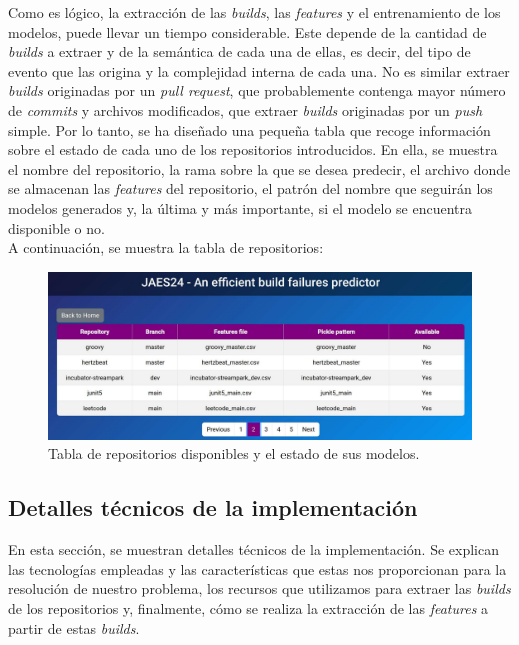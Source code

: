 Como es lógico, la extracción de las \textit{builds}, las \textit{features} y el entrenamiento
de los modelos, puede llevar un tiempo considerable. Este depende de la cantidad de \textit{builds}
a extraer y de la semántica de cada una de ellas, es decir, del tipo de evento que las origina
y la complejidad interna de cada una. No es similar extraer \textit{builds} originadas por un 
\textit{pull request}, que probablemente contenga mayor número de \textit{commits} y archivos 
modificados, que extraer \textit{builds} originadas por un \textit{push} simple. Por lo tanto,
se ha diseñado una pequeña tabla que recoge información sobre el estado de cada uno de los
repositorios introducidos. En ella, se muestra el nombre del repositorio, la rama sobre la que
se desea predecir, el archivo donde se almacenan las \textit{features} del repositorio, el
patrón del nombre que seguirán los modelos generados y, la última y más importante, si el modelo
se encuentra disponible o no.\\

\noindent A continuación, se muestra la tabla de repositorios:

\begin{figure}[H]
    \centering
    \includegraphics[scale=0.3]{images/available-models.pdf}
    \caption{Tabla de repositorios disponibles y el estado de sus modelos.}
    \label{fig:available_models}
\end{figure}

\subsection{Detalles técnicos de la implementación}
En esta sección, se muestran detalles técnicos de la implementación. Se explican las
tecnologías empleadas y las características que estas nos proporcionan para la resolución
de nuestro problema, los recursos que utilizamos para extraer las \textit{builds} de los
repositorios y, finalmente, cómo se realiza la extracción de las \textit{features} a partir de
estas \textit{builds}.

